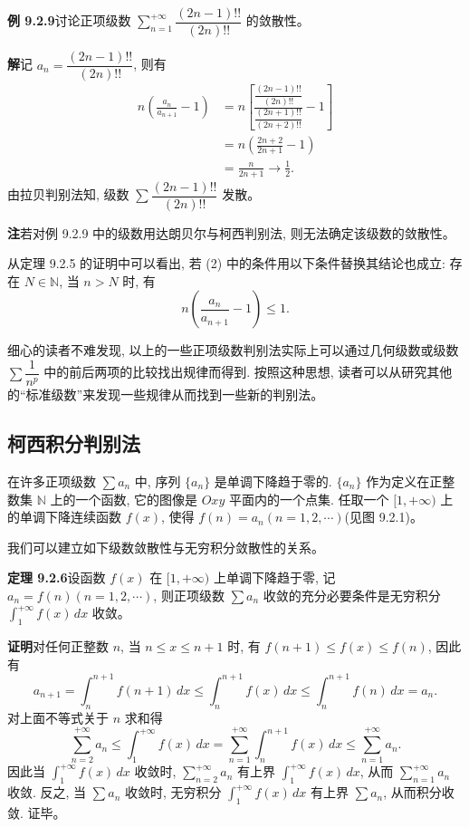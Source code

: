 \documentclass[UTF8,12pt,a4paper,fontset=fandol]{ctexart}
\begin{document}
\noindent\textbf{例 9.2.9}\quad 讨论正项级数 $\sum\limits_{n=1}^{+\infty}\dfrac{(2n-1)!!}{(2n)!!}$ 的敛散性。

\noindent\textbf{解}\quad 记 $a_n=\dfrac{(2n-1)!!}{(2n)!!}$, 则有
\[
\begin{aligned}
  n\left(\frac{a_n}{a_{n+1}}-1\right)
  &=n\left[\frac{\dfrac{(2n-1)!!}{(2n)!!}}{\dfrac{(2n+1)!!}{(2n+2)!!}}-1\right]\\
  &=n\left(\frac{2n+2}{2n+1}-1\right)\\
  &=\frac{n}{2n+1}\to\frac12.
\end{aligned}
\]
由拉贝判别法知, 级数 $\sum\dfrac{(2n-1)!!}{(2n)!!}$ 发散。

\noindent\textbf{注}\quad 若对例 9.2.9 中的级数用达朗贝尔与柯西判别法, 则无法确定该级数的敛散性。

从定理 9.2.5 的证明中可以看出, 若 (2) 中的条件用以下条件替换其结论也成立: 存在 $N\in\mathbb{N}$, 当 $n>N$ 时, 有
\[
  n\left(\frac{a_n}{a_{n+1}}-1\right)\leq1.
\]

细心的读者不难发现, 以上的一些正项级数判别法实际上可以通过几何级数或级数 $\sum\dfrac1{n^p}$ 中的前后两项的比较找出规律而得到. 按照这种思想, 读者可以从研究其他的``标准级数''来发现一些规律从而找到一些新的判别法。

\subsection{柯西积分判别法}

在许多正项级数 $\sum a_n$ 中, 序列 $\{a_n\}$ 是单调下降趋于零的. $\{a_n\}$ 作为定义在正整数集 $\mathbb{N}$ 上的一个函数, 它的图像是 $Oxy$ 平面内的一个点集. 任取一个 $[1,+\infty)$ 上的单调下降连续函数 $f(x)$, 使得 $f(n)=a_n(n=1,2,\cdots)$(见图 9.2.1)。

我们可以建立如下级数敛散性与无穷积分敛散性的关系。

\noindent\textbf{定理 9.2.6}\quad 设函数 $f(x)$ 在 $[1,+\infty)$ 上单调下降趋于零, 记 $a_n=f(n)(n=1,2,\cdots)$, 则正项级数 $\sum a_n$ 收敛的充分必要条件是无穷积分 $\int_1^{+\infty}f(x)\,dx$ 收敛。

\noindent\textbf{证明}\quad 对任何正整数 $n$, 当 $n\leq x\leq n+1$ 时, 有 $f(n+1)\leq f(x)\leq f(n)$, 因此有
\[
  a_{n+1}=\int_n^{n+1}f(n+1)\,dx\leq\int_n^{n+1}f(x)\,dx\leq\int_n^{n+1}f(n)\,dx=a_n.
\]
对上面不等式关于 $n$ 求和得
\[
  \sum_{n=2}^{+\infty}a_n\leq\int_1^{+\infty}f(x)\,dx
  =\sum_{n=1}^{+\infty}\int_n^{n+1}f(x)\,dx
  \leq\sum_{n=1}^{+\infty}a_n.
\]
因此当 $\int_1^{+\infty}f(x)\,dx$ 收敛时, $\sum\limits_{n=2}^{+\infty}a_n$ 有上界 $\int_1^{+\infty}f(x)\,dx$, 从而 $\sum\limits_{n=1}^{+\infty}a_n$ 收敛. 反之, 当 $\sum a_n$ 收敛时, 无穷积分 $\int_1^{+\infty}f(x)\,dx$ 有上界 $\sum a_n$, 从而积分收敛. 证毕。
\end{document}
